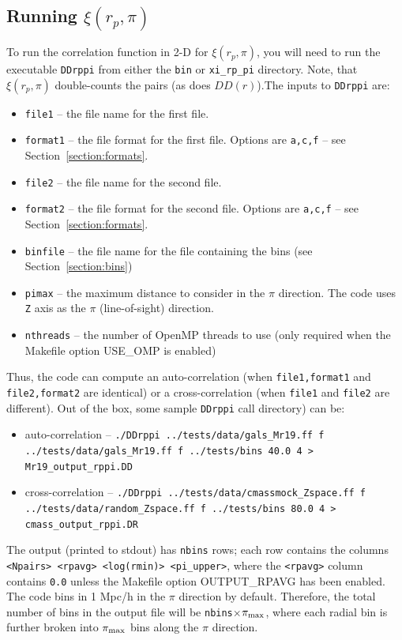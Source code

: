 \documentclass[12pt,titlepage]{article}
\newcommand{\xir}{\ensuremath{{DD(r)}}\xspace}
\newcommand{\xirppi}{\ensuremath{{\xi(r_p,\pi)}}\xspace}
\newcommand{\pimax}{\ensuremath{{\pi_{\rm max}}}\xspace}
\begin{document}
\subsection{Running \texorpdfstring{\xirppi}{xi(rp,pi)}}
To run the correlation function in 2-D for \xirppi, you will need to run the executable \texttt{DDrppi} from either the \texttt{bin} or \texttt{xi\_rp\_pi} directory. Note, that 
\xirppi double-counts the pairs (as does \xir).The inputs 
to \texttt{DDrppi} are:
\begin{itemize}
\item \texttt{file1}   -- the file name for the first file.
\item \texttt{format1} -- the file format for the first file. Options are \texttt{a,c,f} -- see Section~\ref{section:formats}.
\item \texttt{file2}   -- the file name for the second file.
\item \texttt{format2} -- the file format for the second file. Options are \texttt{a,c,f} -- see Section~\ref{section:formats}.
\item \texttt{binfile} -- the file name for the file containing the bins (see Section~\ref{section:bins})
\item \texttt{pimax}   -- the maximum distance to consider in the $\pi$ direction. The code uses \texttt{Z} axis as the $\pi$ (line-of-sight) direction. 
\item \texttt{nthreads} -- the number of OpenMP threads to use (only required when the Makefile option USE\_OMP is enabled)
\end{itemize}
Thus, the code can compute an auto-correlation (when \texttt{file1,format1} and \texttt{file2,format2} are identical) or a cross-correlation (when \texttt{file1} and \texttt{file2} are different). Out of the box, 
some sample \texttt{DDrppi} call directory) can be:
\begin{itemize}
\item auto-correlation --  {\scriptsize \texttt{./DDrppi  ../tests/data/gals\_Mr19.ff f ../tests/data/gals\_Mr19.ff f ../tests/bins 40.0 4 > Mr19\_output\_rppi.DD}}
\item cross-correlation -- {\scriptsize \texttt{./DDrppi ../tests/data/cmassmock\_Zspace.ff f ../tests/data/random\_Zspace.ff f ../tests/bins 80.0 4 > cmass\_output\_rppi.DR}}
\end{itemize}
The output (printed to stdout) has \texttt{nbins} rows; each row contains the columns \texttt{<Npairs> <rpavg> <log(rmin)> <pi\_upper>}, where the \texttt{<rpavg>} column contains \texttt{0.0} unless the 
Makefile option OUTPUT\_RPAVG has been enabled. The code bins in 1 Mpc/h in the $\pi$ direction by default. Therefore, 
the total number of bins in the output file will be \texttt{nbins$\times$\pimax}, where each radial bin is further broken into \pimax bins along the 
$\pi$ direction. 
\end{document}
